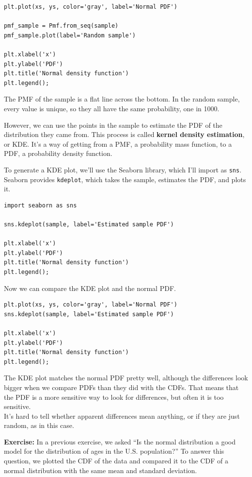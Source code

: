 \begin{lstlisting}[]
plt.plot(xs, ys, color='gray', label='Normal PDF')

pmf_sample = Pmf.from_seq(sample)
pmf_sample.plot(label='Random sample')

plt.xlabel('x')
plt.ylabel('PDF')
plt.title('Normal density function')
plt.legend();
\end{lstlisting}

The PMF of the sample is a flat line across the bottom. In the random
sample, every value is unique, so they all have the same probability,
one in 1000.

However, we can use the points in the sample to estimate the PDF of the
distribution they came from. This process is called \textbf{kernel
density estimation}, or KDE. It's a way of getting from a PMF, a
probability mass function, to a PDF, a probability density function.

To generate a KDE plot, we'll use the Seaborn library, which I'll import
as \passthrough{\lstinline!sns!}. Seaborn provides
\passthrough{\lstinline!kdeplot!}, which takes the sample, estimates the
PDF, and plots it.

\begin{lstlisting}[]
import seaborn as sns

sns.kdeplot(sample, label='Estimated sample PDF')

plt.xlabel('x')
plt.ylabel('PDF')
plt.title('Normal density function')
plt.legend();
\end{lstlisting}

Now we can compare the KDE plot and the normal PDF.

\begin{lstlisting}[]
plt.plot(xs, ys, color='gray', label='Normal PDF')
sns.kdeplot(sample, label='Estimated sample PDF')

plt.xlabel('x')
plt.ylabel('PDF')
plt.title('Normal density function')
plt.legend();
\end{lstlisting}

The KDE plot matches the normal PDF pretty well, although the
differences look bigger when we compare PDFs than they did with the
CDFs. That means that the PDF is a more sensitive way to look for
differences, but often it is too sensitive.\\
It's hard to tell whether apparent differences mean anything, or if they
are just random, as in this case.

\textbf{Exercise:} In a previous exercise, we asked ``Is the normal
distribution a good model for the distribution of ages in the U.S.
population?'' To answer this question, we plotted the CDF of the data
and compared it to the CDF of a normal distribution with the same mean
and standard deviation.

